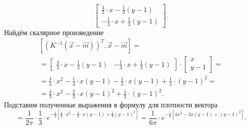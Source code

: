 \begin{enumerate}[label=\alph*)]
\begin{equation*}
    \begin{bmatrix}
      \frac{4}{3} \cdot x - \frac{1}{3} \left( y - 1 \right) \\
      -\frac{1}{3} \cdot x + \frac{1}{3} \left( y - 1 \right)
    \end{bmatrix}.
  \end{equation*}
  Найдём скалярное произведение
  \begin{gather*}
    \left[
      \left( K^{-1} \left( \vec{x} - \vec{m} \right) \right)^T,
      \vec{x} - \vec{m}
    \right] = \\
    = \begin{bmatrix}
      \frac{4}{3} \cdot x - \frac{1}{3} \left( y - 1 \right) &
      -\frac{1}{3} \cdot x + \frac{1}{3} \left( y - 1 \right)
    \end{bmatrix} \cdot
    \begin{bmatrix}
      x \\
      y - 1
    \end{bmatrix} = \\
    = \frac{4}{3} \cdot x^2 - \frac{1}{3} \cdot x \left( y - 1 \right) -
    \frac{1}{3} \cdot x \left( y - 1 \right) +
    \frac{1}{3} \cdot \left( y - 1 \right)^2 = \\
    = \frac{4}{3} \cdot x^2 - \frac{2}{3} \cdot x \left( y - 1 \right)^2 +
    \frac{1}{3} \cdot \left( y - 1 \right)^2.
  \end{gather*}
  Подставим полученные выражения в формулу для плотности вектора
  \begin{equation*}
    = \frac{1}{2 \pi } \cdot \frac{1}{3} \cdot
    e^{-\frac{1}{2} \left[ \frac{4}{3} \cdot x^2 - \frac{2}{3} \cdot x \left( y - 1 \right) + \frac{1}{3} \left( y - 1 \right)^2 \right] } =
    \frac{1}{6 \pi } \cdot
    e^{-\frac{1}{6} \left[ 4x^2 - 2x \left( y - 1 \right) + \left( y - 1 \right)^2 \right] }.
  \end{equation*}


\end{enumerate}
